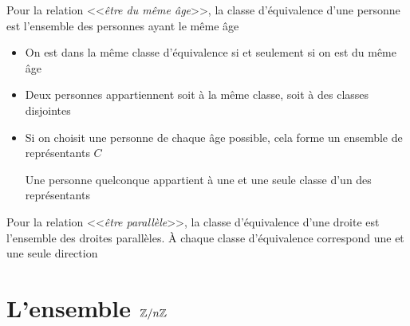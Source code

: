 \begin{frame}

\begin{exemple}
Pour la relation <<\emph{être du même âge}>>, la classe d'équivalence d'une personne est l'ensemble
des personnes ayant le même âge 
\pause
  \begin{itemize}
    \item On est dans la même classe d'équivalence si et seulement si on est du même âge

\pause
    \item Deux personnes appartiennent soit à la même classe, soit à des classes disjointes

\pause
    \item Si on choisit une personne de chaque âge possible, cela forme un ensemble de représentants $C$

Une personne quelconque appartient à une et une seule classe d'un des représentants
  \end{itemize}

\end{exemple}

\pause

\begin{exemple}
Pour la relation <<\emph{être parallèle}>>, la classe d'équivalence d'une droite est l'ensemble des droites parallèles.
À chaque classe d'équivalence correspond une et une seule direction
\end{exemple}

\end{frame}


\section{L'ensemble $\mathbb{Z}/n\mathbb{Z}$}

